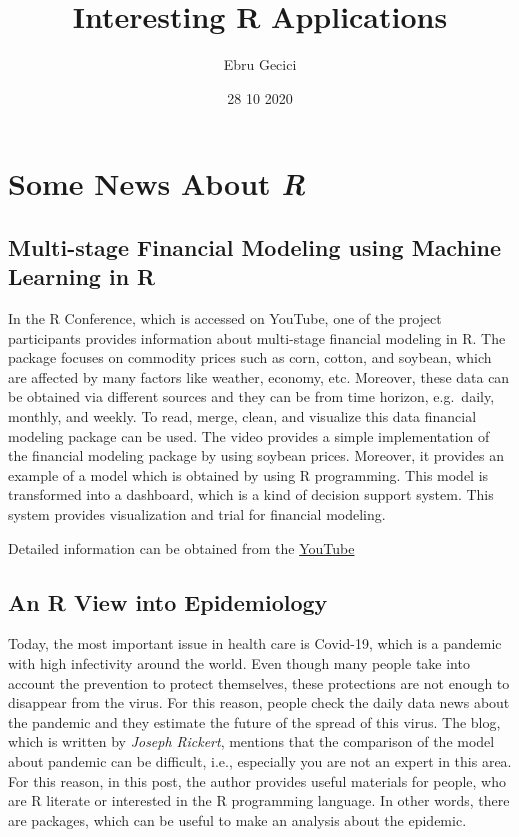 \documentclass[
]{article}
\title{Interesting R Applications}
\author{Ebru Gecici}
\date{28 10 2020}
\begin{document}
\maketitle

{
\setcounter{tocdepth}{3}
\tableofcontents
}
\hypertarget{some-news-about-r}{%
\section{\texorpdfstring{Some News About
\emph{R}}{Some News About R}}\label{some-news-about-r}}

\hypertarget{multi-stage-financial-modeling-using-machine-learning-in-r}{%
\subsection{Multi-stage Financial Modeling using Machine Learning in
R}\label{multi-stage-financial-modeling-using-machine-learning-in-r}}

In the R Conference, which is accessed on YouTube, one of the project
participants provides information about multi-stage financial modeling
in R. The package focuses on commodity prices such as corn, cotton, and
soybean, which are affected by many factors like weather, economy, etc.
Moreover, these data can be obtained via different sources and they can
be from time horizon, e.g.~daily, monthly, and weekly. To read, merge,
clean, and visualize this data financial modeling package can be used.
The video provides a simple implementation of the financial modeling
package by using soybean prices. Moreover, it provides an example of a
model which is obtained by using R programming. This model is
transformed into a dashboard, which is a kind of decision support
system. This system provides visualization and trial for financial
modeling.

Detailed information can be obtained from the
\href{https://www.youtube.com/watch?v=-cgwDHzd0p4}{YouTube}

\hypertarget{an-r-view-into-epidemiology}{%
\subsection{An R View into
Epidemiology}\label{an-r-view-into-epidemiology}}

Today, the most important issue in health care is Covid-19, which is a
pandemic with high infectivity around the world. Even though many people
take into account the prevention to protect themselves, these
protections are not enough to disappear from the virus. For this reason,
people check the daily data news about the pandemic and they estimate
the future of the spread of this virus. The blog, which is written by
\emph{Joseph Rickert}, mentions that the comparison of the model about
pandemic can be difficult, i.e., especially you are not an expert in
this area. For this reason, in this post, the author provides useful
materials for people, who are R literate or interested in the R
programming language. In other words, there are packages, which can be
useful to make an analysis about the epidemic.
\end{document}
